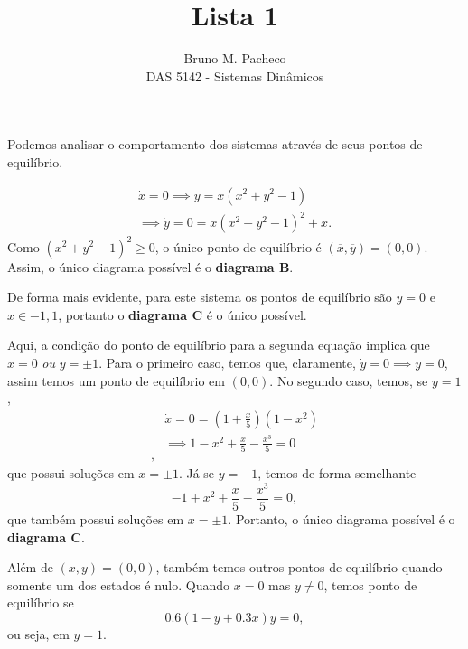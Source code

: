 \documentclass[a4paper]{report}
\begin{document}
 
\title{Lista 1}
\author{Bruno M. Pacheco\\
DAS 5142 - Sistemas Dinâmicos}
 
\maketitle
 

Podemos analisar o comportamento dos sistemas através de seus pontos de equilíbrio.


\begin{align*}
    \dot{x} = 0 \implies y = x\left( x^2 + y^2 -1 \right) \\
    \implies \dot{y} = 0 = x\left( x^2 + y^2 -1 \right)^2 + x
.\end{align*}
Como $\left( x^2 + y^2 -1 \right)^2 \ge 0$, o único ponto de equilíbrio é $(\overline{x}, \overline{y}) = (0,0)$. Assim, o único diagrama possível é o \textbf{diagrama B}.


De forma mais evidente, para este sistema os pontos de equilíbrio são $y=0$ e $x \in {-1,1}$, portanto o \textbf{diagrama C} é o único possível.


Aqui, a condição do ponto de equilíbrio para a segunda equação implica que $x=0$ \emph{ou} $y = \pm 1$. Para o primeiro caso, temos que, claramente, $\dot{y}=0 \implies y=0$, assim temos um ponto de equilíbrio em $\left( 0,0 \right) $. No segundo caso, temos, se $y=1$,
\begin{align*}
    &\dot{x}=0=\left( 1 + \frac{x}{5} \right) \left( 1-x^2 \right) \\
    &\implies 1 -x^2 + \frac{x}{5} - \frac{x^3}{5} = 0 \\
,\end{align*}
que possui soluções em $x=\pm 1$. Já se $y=-1$, temos de forma semelhante  \[
-1 + x^2+ \frac{x}{5} - \frac{x^3}{5} = 0
,\] que também possui soluções em $x=\pm 1$. Portanto, o único diagrama possível é o  \textbf{diagrama C}.


Além de $\left( x,y \right) = \left( 0,0 \right) $, também temos outros pontos de equilíbrio quando somente um dos estados é nulo. Quando $x=0$ mas $y\neq 0$, temos ponto de equilíbrio se \[
    0.6\left( 1-y+0.3x \right) y = 0
,\] ou seja, em $y=1$.
\end{document}
